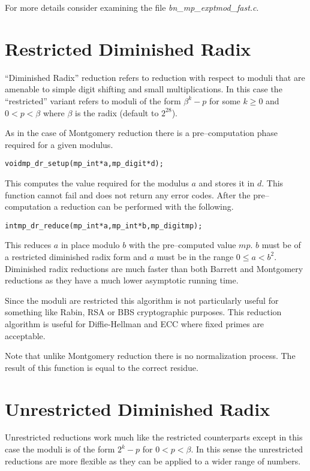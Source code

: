 \documentclass[synpaper]{book}
\begin{document}
For more details consider examining the file \textit{bn\_mp\_exptmod\_fast.c}.

\section{Restricted Diminished Radix}

``Diminished Radix'' reduction refers to reduction with respect to moduli that are amenable to simple
digit shifting and small multiplications.  In this case the ``restricted'' variant refers to moduli of the
form $\beta^k - p$ for some $k \ge 0$ and $0 < p < \beta$ where $\beta$ is the radix (default to $2^{28}$).

As in the case of Montgomery reduction there is a pre--computation phase required for a given modulus.

\begin{alltt}
void mp_dr_setup(mp_int *a, mp_digit *d);
\end{alltt}

This computes the value required for the modulus $a$ and stores it in $d$.  This function cannot fail
and does not return any error codes.  After the pre--computation a reduction can be performed with the
following.

\begin{alltt}
int mp_dr_reduce(mp_int *a, mp_int *b, mp_digit mp);
\end{alltt}

This reduces $a$ in place modulo $b$ with the pre--computed value $mp$.  $b$ must be of a restricted
diminished radix form and $a$ must be in the range $0 \le a < b^2$.  Diminished radix reductions are
much faster than both Barrett and Montgomery reductions as they have a much lower asymptotic running time.

Since the moduli are restricted this algorithm is not particularly useful for something like Rabin, RSA or
BBS cryptographic purposes.  This reduction algorithm is useful for Diffie-Hellman and ECC where fixed
primes are acceptable.

Note that unlike Montgomery reduction there is no normalization process.  The result of this function is
equal to the correct residue.

\section{Unrestricted Diminished Radix}

Unrestricted reductions work much like the restricted counterparts except in this case the moduli is of the
form $2^k - p$ for $0 < p < \beta$.  In this sense the unrestricted reductions are more flexible as they
can be applied to a wider range of numbers.
\end{document}
